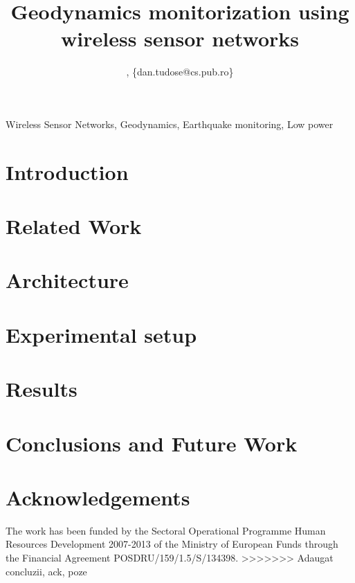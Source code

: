 \documentclass[conference]{IEEEtran}
\begin{document}
\title{Geodynamics monitorization using wireless sensor networks}

\author{
, \{dan.tudose@cs.pub.ro\}
}


 
\maketitle

\begin{abstract} 

\end{abstract}

\begin{IEEEkeywords}
Wireless Sensor Networks, Geodynamics, Earthquake monitoring, Low power
\end{IEEEkeywords}

\section{Introduction}
\label{sec:introduction}


\section{Related Work}
\label{sec:related}


\section{Architecture}
\label{sec:architecture}


\section{Experimental setup}
\label{sec:experimental}


\section{Results}
\label{sec:results}


\section{Conclusions and Future Work}
\label{sec:conclusion}


\section{Acknowledgements}
\label{sec:Acknowledgements}
The work has been funded by the Sectoral Operational Programme Human Resources Development 2007-2013 of the Ministry of European Funds through the Financial Agreement POSDRU/159/1.5/S/134398.
>>>>>>> Adaugat concluzii, ack, poze



\end{document}
